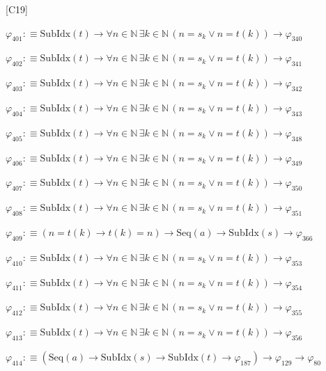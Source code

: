 \begin{fullproof}{[C19]}
\begin{abbrevlist}
\item $\varphi_{401} :\equiv \mathrm{SubIdx}(t) \to \forall n \in \mathbb{N}\,\exists k \in \mathbb{N}\,(n = s_{k} \lor n = t(k)) \to \varphi_{340}$
\item $\varphi_{402} :\equiv \mathrm{SubIdx}(t) \to \forall n \in \mathbb{N}\,\exists k \in \mathbb{N}\,(n = s_{k} \lor n = t(k)) \to \varphi_{341}$
\item $\varphi_{403} :\equiv \mathrm{SubIdx}(t) \to \forall n \in \mathbb{N}\,\exists k \in \mathbb{N}\,(n = s_{k} \lor n = t(k)) \to \varphi_{342}$
\item $\varphi_{404} :\equiv \mathrm{SubIdx}(t) \to \forall n \in \mathbb{N}\,\exists k \in \mathbb{N}\,(n = s_{k} \lor n = t(k)) \to \varphi_{343}$
\item $\varphi_{405} :\equiv \mathrm{SubIdx}(t) \to \forall n \in \mathbb{N}\,\exists k \in \mathbb{N}\,(n = s_{k} \lor n = t(k)) \to \varphi_{348}$
\item $\varphi_{406} :\equiv \mathrm{SubIdx}(t) \to \forall n \in \mathbb{N}\,\exists k \in \mathbb{N}\,(n = s_{k} \lor n = t(k)) \to \varphi_{349}$
\item $\varphi_{407} :\equiv \mathrm{SubIdx}(t) \to \forall n \in \mathbb{N}\,\exists k \in \mathbb{N}\,(n = s_{k} \lor n = t(k)) \to \varphi_{350}$
\item $\varphi_{408} :\equiv \mathrm{SubIdx}(t) \to \forall n \in \mathbb{N}\,\exists k \in \mathbb{N}\,(n = s_{k} \lor n = t(k)) \to \varphi_{351}$
\item $\varphi_{409} :\equiv (n = t(k) \to t(k) = n) \to \mathrm{Seq}(a) \to \mathrm{SubIdx}(s) \to \varphi_{366}$
\item $\varphi_{410} :\equiv \mathrm{SubIdx}(t) \to \forall n \in \mathbb{N}\,\exists k \in \mathbb{N}\,(n = s_{k} \lor n = t(k)) \to \varphi_{353}$
\item $\varphi_{411} :\equiv \mathrm{SubIdx}(t) \to \forall n \in \mathbb{N}\,\exists k \in \mathbb{N}\,(n = s_{k} \lor n = t(k)) \to \varphi_{354}$
\item $\varphi_{412} :\equiv \mathrm{SubIdx}(t) \to \forall n \in \mathbb{N}\,\exists k \in \mathbb{N}\,(n = s_{k} \lor n = t(k)) \to \varphi_{355}$
\item $\varphi_{413} :\equiv \mathrm{SubIdx}(t) \to \forall n \in \mathbb{N}\,\exists k \in \mathbb{N}\,(n = s_{k} \lor n = t(k)) \to \varphi_{356}$
\item $\varphi_{414} :\equiv (\mathrm{Seq}(a) \to \mathrm{SubIdx}(s) \to \mathrm{SubIdx}(t) \to \varphi_{187}) \to \varphi_{129} \to \varphi_{80}$

\end{abbrevlist}
\end{fullproof}
